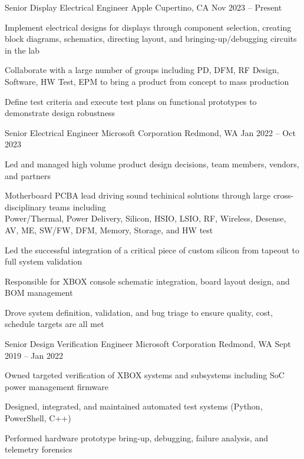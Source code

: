 \documentclass[]{awesome-cv}
\begin{document}
\begin{cventries}
	\cventry
	{Senior Display Electrical Engineer}
	{Apple}
	{Cupertino, CA}
	{Nov 2023 – Present}
	{\begin{cvitems}
  \item {Implement electrical designs for displays through component selection, creating block diagrams, schematics, directing layout, and bringing-up/debugging circuits in the lab}
  \item {Collaborate with a large number of groups including PD, DFM, RF Design, Software, HW Test, EPM to bring a product from concept to mass production}
  \item {Define test criteria and execute test plans on functional prototypes to demonstrate design robustness}
	\end{cvitems}}
	\cventry
	{Senior Electrical Engineer}
	{Microsoft Corporation}
	{Redmond, WA}
	{Jan 2022 – Oct 2023}
	{\begin{cvitems}
 	\item {Led and managed high volume product design decisions, team members, vendors, and partners}
		\item {Motherboard PCBA lead driving sound techinical solutions through large cross-disciplinary teams including \\ 
  			Power/Thermal, Power Delivery, Silicon, HSIO, LSIO, RF, Wireless, Desense, AV, ME, SW/FW, DFM, Memory, Storage, and HW test}
		\item {Led the successful integration of a critical piece of custom silicon from tapeout to full system validation}
		\item {Responsible for XBOX console schematic integration, board layout design, and BOM management}
		\item {Drove system definition, validation, and bug triage to ensure quality, cost, schedule targets are all met}
	\end{cvitems}}
	\cventry
	{Senior Design Verification Engineer}
	{Microsoft Corporation}
	{Redmond, WA}
	{Sept 2019 – Jan 2022}
	{\begin{cvitems}
		\item {Owned targeted verification of XBOX systems and subsystems including SoC power management firmware}
		\item {Designed, integrated, and maintained automated test systems (Python, PowerShell, C++)}
		\item {Performed hardware prototype bring-up, debugging, failure analysis, and telemetry forensics}

\end{cvitems}}
\end{cventries}
\end{document}
